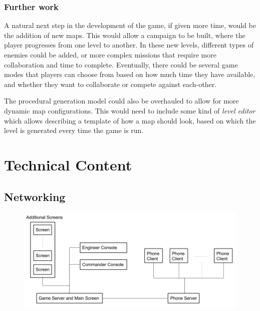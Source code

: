 \documentclass[a4paper,11pt]{article}
\begin{document}
\subsubsection{Further work}


A natural next step in the development of the game, if given more time, would be the addition of new maps. This would allow a campaign to be built, where the player progresses from one level to another. In these new levels, different types of enemies could be added, or more complex missions that require more collaboration and time to complete. Eventually, there could be several game modes that players can choose from based on how much time they have available, and whether they want to collaborate or compete against each-other.

The procedural generation model could also be overhauled to allow for more dynamic map configurations. This would need to include some kind of \emph{level editor} which allows describing a template of how a map should look, based on which the level is generated every time the game is run.

\section{Technical Content}
\subsection{Networking}

\begin{figure}[ht]
	\centering
	\includegraphics[width=\textwidth]{images/network_diagram}
    \label{fig:network_diagram}
\end{figure}
\end{document}
